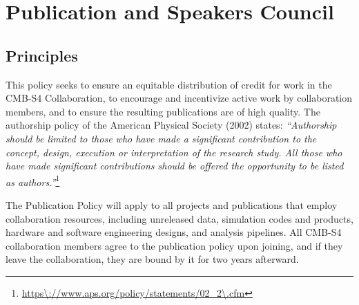 \section{Publication and Speakers Council}
\label{sec:pub}





\subsection{Principles}
This policy seeks to ensure an equitable distribution of credit for work in the CMB-S4 Collaboration, to encourage and incentivize active work by collaboration members, and to ensure the resulting publications are of high quality. The authorship policy of the American Physical Society (2002) states: \textit{``Authorship should be limited to those who have made a significant contribution to the concept, design, execution or interpretation of the research study. All those who have made significant contributions should be offered the opportunity to be listed as authors.''}\footnote{\url{https\://www.aps.org/policy/statements/02\_2\.cfm}}

The Publication Policy will apply to all projects and publications that employ collaboration resources, including unreleased data, simulation codes and products, hardware and software
engineering designs, and analysis pipelines. All CMB-S4 collaboration members agree to the publication policy upon joining, and if they leave the collaboration, they are bound by it for two years afterward.

